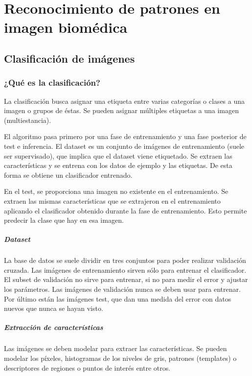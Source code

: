 \chapter{Reconocimiento de patrones en imagen biomédica}
\section{Clasificación de imágenes}
\subsection{¿Qué es la clasificación?}
La clasificación busca asignar una etiqueta entre varias categorías o clases a una imagen o grupos de éstas. Se pueden asignar múltiples etiquetas a una imagen (multiestancia).

El algoritmo pasa primero por una fase de entrenamiento y una fase posterior de test e inferencia. El dataset es un conjunto de imágenes de entrenamiento (suele ser supervisado), que implica que el dataset viene etiquetado. Se extraen las características y se entrena con los datos de ejemplo y las etiquetas. De esta forma se obtiene un clasificador entrenado. 

En el test, se proporciona una imagen no existente en el entrenamiento. Se extraen las mismas características que se extrajeron en el entrenamiento aplicando el clasificador obtenido durante la fase de entrenamiento. Esto permite predecir la clase que hay en esa imagen.

\paragraph{Dataset} 
La base de datos se suele dividir en tres conjuntos para poder realizar validación cruzada. Las imágenes de entrenamiento sirven sólo para entrenar el clasificador. El subset de validación no sirve para entrenar, si no para medir el error y ajustar los parámetros. Las imágenes de validación nunca se deben usar para entrenar. Por último están las imágenes test, que dan una medida del error con datos nuevos que nunca se hayan visto. 

\paragraph{Extracción de características}
Las imágenes se deben modelar para extraer las características. Se pueden modelar los píxeles, histogramas de los niveles de gris, patrones (templates) o descriptores de regiones o puntos de interés entre otros.

